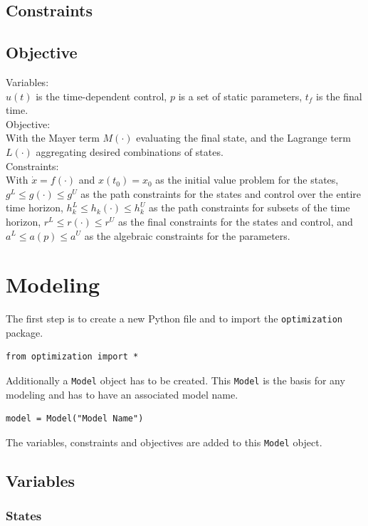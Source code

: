 \documentclass[12pt]{article}
\begin{document}
\subsection{Constraints}

\subsection{Objective}
Variables:
\\
$u(t)$ is the time-dependent control, $p$ is a set of static
parameters, $t_f$ is the final time.
\\
Objective:
\\
With the Mayer term $M(\cdot)$ evaluating the final state, and the
Lagrange term $L(\cdot)$ aggregating desired combinations of states.
\\
Constraints:
\\
With $\dot{x} = f(\cdot)$ and $x(t_0) = x_0$ as the initial value
problem for the states, $g^L \leq g(\cdot) \leq g^U$ as the path constraints
for the states and control over the entire time horizon, $h^L_k \leq h_k(\cdot)
	\leq h^U_k$ as the path constraints for subsets of the time horizon,
$r^L \leq
	r(\cdot) \leq r^U$ as the final constraints for the states and control,
and
$a^L \leq a(p) \leq a^U$ as the algebraic constraints for the parameters.

\section{Modeling}

The first step is to create a new Python file and to import the
\texttt{optimization} package.
\begin{lstlisting}
from optimization import *
	\end{lstlisting}

Additionally a \texttt{Model} object has to be created. This
\texttt{Model} is the basis for any modeling and has to have an associated
model name.
\begin{lstlisting}
model = Model("Model Name")
	\end{lstlisting}

The variables, constraints and objectives are added to this
\texttt{Model} object.

\subsection{Variables}

\subsubsection{States}
\end{document}
